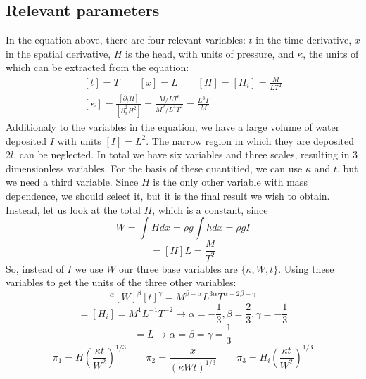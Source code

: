 \documentclass{article}
\begin{document}
\subsection{Relevant parameters}
In the equation above, there are four relevant variables: $t$ in the time derivative, $x$ in the spatial derivative, $H$ is the head, with units of pressure, and $\kappa$, the units of which can be extracted from the equation:
\begin{equation}
\begin{gathered}
    [t] = T
    \qquad
    [x] = L
    \qquad
    [H] = [H_i] = \frac{M}{LT^2}
    \\
    [\kappa] = \frac{[\partial_t H]}{[\partial_x^2 H^2]} = \frac{M/LT^3}{M^2/L^4T^4} = \frac{L^3T}{M}
\end{gathered}
\end{equation}
Additionaly to the variables in the equation, we have a large volume of water deposited $I$ with units $[I] = L^2$. The narrow region in which they are deposited $2l$, can be neglected. In total we have six variables and three scales, resulting in 3 dimensionless variables.
\newline
For the basis of these quantitied, we can use $\kappa$ and $t$, but we need a third variable. Since $H$ is the only other variable with mass dependence, we should select it, but it is the final result we wish to obtain. Instead, let us look at the total $H$, which is a constant, since
\begin{equation}
    W = \int H dx = \rho g \int h dx = \rho g I
\end{equation}
\begin{equation}
    [W] = [H]L = \frac{M}{T^2}
\end{equation}
So, instead of $I$ we use $W$ our three base variables are $\{\kappa, W, t\}$. Using these variables to get the units of the three other variables:
\begin{equation}
    [\kappa]^\alpha[W]^\beta [t]^\gamma = M^{\beta - \alpha}L^{3\alpha}T^{\alpha - 2\beta + \gamma}
\end{equation}
\begin{equation}
    [H] = [H_i] = M^1 L^{-1} T^{-2} \rightarrow
    \alpha = -\frac{1}{3}, \beta = \frac{2}{3}, \gamma = -\frac{1}{3}
\end{equation}
\begin{equation}
    [x] = L \rightarrow \alpha = \beta = \gamma = \frac{1}{3}
\end{equation}
\begin{equation}
    \boxed{
        \pi_1 = H\left(\frac{\kappa t}{W^2}\right)^{1/3}
        \qquad
        \pi_2 = \frac{x}{(\kappa W t)^{1/3}}
        \qquad
        \pi_3 = H_i\left(\frac{\kappa t}{W^2}\right)^{1/3}
    }
\end{equation}
\end{document}
